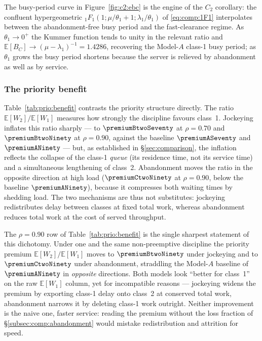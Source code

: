 The busy-period curve in Figure~\ref{fig:c2:ebc} is the engine of the $C_2$ corollary: the
confluent hypergeometric ${}_1F_1(1;\mu/\theta_1+1;\lambda_1/\theta_1)$ of
\eqref{eq:comp:1F1} interpolates between the abandonment-free busy period and the
fast-clearance regime. As $\theta_1\to0^+$ the Kummer function tends to unity in the
relevant ratio and $\mathbb{E}[B_C]\to(\mu-\lambda_1)^{-1}=1.4286$, recovering the Model-$A$
class-1 busy period; as $\theta_1$ grows the busy period shortens because the server is
relieved by abandonment as well as by service.

\subsubsection{The priority benefit}



Table~\ref{tab:prio:benefit} contrasts the priority structure directly. The ratio
$\mathbb{E}[W_2]/\mathbb{E}[W_1]$ measures how strongly the discipline favours class~1.
Jockeying inflates this ratio sharply --- to $\premiumBtwoSeventy$ at $\rho=0.70$ and
$\premiumBtwoNinety$ at $\rho=0.90$, against the baseline $\premiumASeventy$ and
$\premiumANinety$ --- but, as established in \S\ref{sec:comparison}, the inflation reflects the
collapse of the class-1 \emph{queue} (its residence time, not its service time) and a
simultaneous lengthening of class~2. Abandonment moves the ratio in the opposite direction at
high load ($\premiumCtwoNinety$ at $\rho=0.90$, below the baseline $\premiumANinety$), because
it compresses both waiting times by shedding load. The two mechanisms are thus not
substitutes: jockeying redistributes delay between classes at fixed total work, whereas
abandonment reduces total work at the cost of served throughput.

The $\rho=0.90$ row of Table~\ref{tab:prio:benefit} is the single sharpest statement of this
dichotomy. Under one and the same non-preemptive discipline the priority premium
$\mathbb{E}[W_2]/\mathbb{E}[W_1]$ moves to $\premiumBtwoNinety$ under jockeying and to
$\premiumCtwoNinety$ under abandonment, straddling the Model-$A$ baseline of $\premiumANinety$
in \emph{opposite} directions. Both models look ``better for class~1'' on the raw
$\mathbb{E}[W_1]$ column, yet for incompatible reasons --- jockeying widens the premium by
exporting class-1 delay onto class~2 at conserved total work, abandonment narrows it by
deleting class-1 work outright. Neither improvement is the naive one, faster service: reading
the premium without the loss fraction of \S\ref{subsec:comp:abandonment} would mistake
redistribution and attrition for speed.

